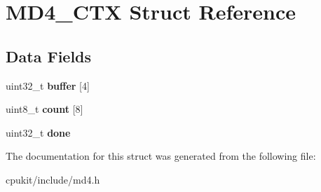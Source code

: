 \hypertarget{structMD4__CTX}{}\section{M\+D4\+\_\+\+C\+TX Struct Reference}
\label{structMD4__CTX}
\subsection*{Data Fields}
\begin{DoxyCompactItemize}
\item 
\mbox{\label{structMD4__CTX_a1c90e01e39916d0b4472e1c61412b3a4}} 
uint32\+\_\+t {\bfseries buffer} \mbox{[}4\mbox{]}
\item 
\mbox{\label{structMD4__CTX_a1776e2d9660da0670b6421a0286499ec}} 
uint8\+\_\+t {\bfseries count} \mbox{[}8\mbox{]}
\item 
\mbox{\label{structMD4__CTX_ab8c87e628bb0270c52ec4b33f0d43d6c}} 
uint32\+\_\+t {\bfseries done}
\end{DoxyCompactItemize}


The documentation for this struct was generated from the following file\+:\begin{DoxyCompactItemize}
\item 
cpukit/include/md4.\+h\end{DoxyCompactItemize}
